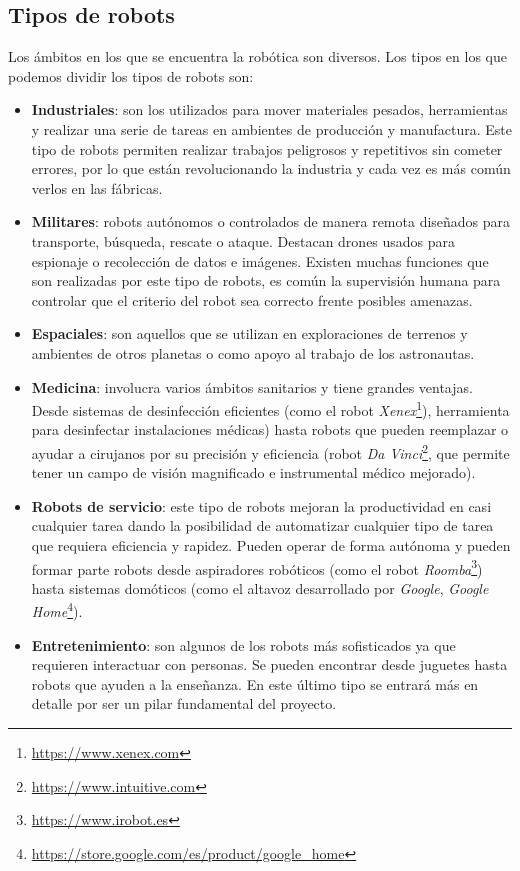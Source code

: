 \subsection{Tipos de robots}
\label{subsec:tiposRobots}
Los ámbitos en los que se encuentra la robótica son diversos. Los tipos en los que podemos dividir los tipos de robots son: 
\begin{itemize}
    \item \textbf{Industriales}: son los utilizados para mover materiales pesados, herramientas y realizar una serie de tareas en ambientes de producción y manufactura. Este tipo de robots permiten realizar trabajos peligrosos y repetitivos sin cometer errores, por lo que están revolucionando la industria y cada vez es más común verlos en las fábricas.   
    \item \textbf{Militares}: robots autónomos o controlados de manera remota diseñados para transporte, búsqueda, rescate o ataque. Destacan drones usados para espionaje o recolección de datos e imágenes. 
    Existen muchas funciones que son realizadas por este tipo de robots, es común la supervisión humana para controlar que el criterio del robot sea correcto frente posibles amenazas. 
    \item \textbf{Espaciales}: son aquellos que se utilizan en exploraciones de terrenos y ambientes de otros planetas o como apoyo al trabajo de los astronautas. 
    \item \textbf{Medicina}: involucra varios ámbitos sanitarios y tiene grandes ventajas. Desde sistemas de desinfección eficientes (como el robot \textit{Xenex}\footnote{\url{https://www.xenex.com}}), herramienta para desinfectar instalaciones médicas) hasta robots que pueden reemplazar o ayudar a cirujanos por su precisión y eficiencia (robot \textit{Da Vinci}\footnote{\url{https://www.intuitive.com}}, que permite tener un campo de visión magnificado e instrumental médico mejorado). 
    \item \textbf{Robots de servicio}: este tipo de robots mejoran la productividad en casi cualquier tarea dando la posibilidad de automatizar cualquier tipo de tarea que requiera eficiencia y rapidez. Pueden operar de forma autónoma y pueden formar parte robots desde aspiradores robóticos (como el robot   \textit{Roomba}\footnote{\url{https://www.irobot.es}}) hasta sistemas domóticos (como el altavoz desarrollado por \textit{Google}, \textit{Google Home}\footnote{\url{https://store.google.com/es/product/google_home}}).
    \item \textbf{Entretenimiento}: son algunos de los robots más sofisticados ya que requieren interactuar con personas. Se pueden encontrar desde juguetes hasta robots que ayuden a la enseñanza. En este último tipo se entrará más en detalle por ser un pilar fundamental del proyecto.
\end{itemize}
